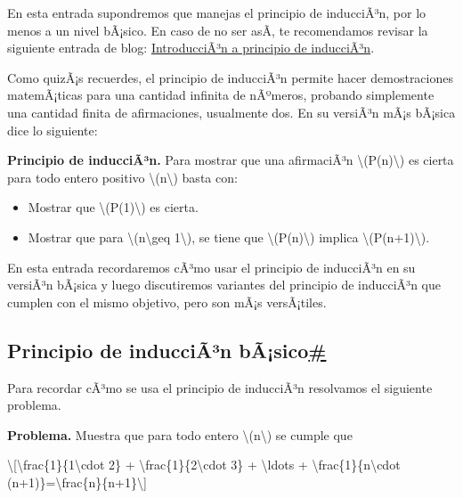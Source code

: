 En esta entrada supondremos que manejas el principio de inducciÃ³n, por
lo menos a un nivel bÃ¡sico. En caso de no ser asÃ­, te recomendamos
revisar la siguiente entrada de blog:
\href{https://blog.nekomath.com/seminario-de-resolucion-de-problemas-principio-de-induccion/}{IntroducciÃ³n
a principio de inducciÃ³n}.

Como quizÃ¡s recuerdes, el principio de inducciÃ³n permite hacer
demostraciones matemÃ¡ticas para una cantidad infinita de nÃºmeros,
probando simplemente una cantidad finita de afirmaciones, usualmente
dos. En su versiÃ³n mÃ¡s bÃ¡sica dice lo siguiente:

\textbf{Principio de inducciÃ³n.} Para mostrar que una afirmaciÃ³n
{\textbackslash(P(n)\textbackslash)} es cierta para todo entero positivo
{\textbackslash(n\textbackslash)} basta con:

\begin{itemize}
\item
  Mostrar que {\textbackslash(P(1)\textbackslash)} es cierta.
\item
  Mostrar que para {\textbackslash(n\textbackslash geq
  1\textbackslash)}, se tiene que {\textbackslash(P(n)\textbackslash)}
  implica {\textbackslash(P(n+1)\textbackslash)}.
\end{itemize}

En esta entrada recordaremos cÃ³mo usar el principio de inducciÃ³n en su
versiÃ³n bÃ¡sica y luego discutiremos variantes del principio de
inducciÃ³n que cumplen con el mismo objetivo, pero son mÃ¡s versÃ¡tiles.

\label{principio-de-induccion-basico}
\subsection{\texorpdfstring{Principio de inducciÃ³n
bÃ¡sico\hyperref[principio-de-induccion-basico]{\#}}{Principio de inducciÃ³n bÃ¡sico\#}}\label{principio-de-inducciuxe3uxb3n-buxe3sico}

Para recordar cÃ³mo se usa el principio de inducciÃ³n resolvamos el
siguiente problema.

\textbf{Problema.} Muestra que para todo entero
{\textbackslash(n\textbackslash)} se cumple que

\textbackslash{[}\textbackslash frac\{1\}\{1\textbackslash cdot 2\} +
\textbackslash frac\{1\}\{2\textbackslash cdot 3\} +
\textbackslash ldots + \textbackslash frac\{1\}\{n\textbackslash cdot
(n+1)\}=\textbackslash frac\{n\}\{n+1\}\textbackslash{]}

